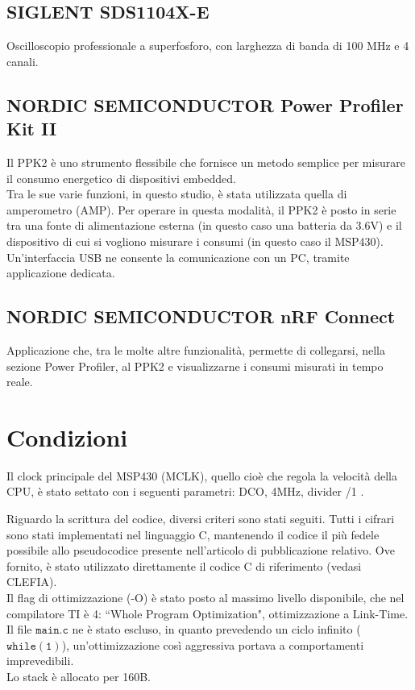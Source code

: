 \documentclass[target=bach,aauheader=,style=]{thud}
\begin{document}
		\subsection{SIGLENT SDS1104X-E}
		Oscilloscopio professionale a superfosforo, con larghezza di banda di 100 MHz e 4 canali.
		
		\subsection{NORDIC SEMICONDUCTOR Power Profiler Kit II}
		Il PPK2 è uno strumento flessibile che fornisce un metodo semplice per misurare il consumo energetico di dispositivi embedded.\\
		Tra le sue varie funzioni, in questo studio, è stata utilizzata quella di amperometro (AMP). Per operare in questa modalità, il PPK2 è posto in serie tra una fonte di alimentazione esterna (in questo caso una batteria da 3.6V) e il dispositivo di cui si vogliono misurare i consumi (in questo caso il MSP430).\\
		Un'interfaccia USB ne consente la comunicazione con un PC, tramite applicazione dedicata.
		
		\subsection{NORDIC SEMICONDUCTOR nRF Connect}
		Applicazione che, tra le molte altre funzionalità, permette di collegarsi, nella sezione Power Profiler, al PPK2 e visualizzarne i consumi misurati in tempo reale.
	\section{Condizioni}
	Il clock principale del MSP430 (MCLK), quello cioè che regola la velocità della CPU, è stato settato con i seguenti parametri: DCO, 4MHz, divider /1 \cite{mspuser}.
	
	Riguardo la scrittura del codice, diversi criteri sono stati seguiti. Tutti i cifrari sono stati implementati nel linguaggio C, mantenendo il codice il più fedele possibile allo pseudocodice presente nell'articolo di pubblicazione relativo. Ove fornito, è stato utilizzato direttamente il codice C di riferimento (vedasi CLEFIA).\\
	Il flag di ottimizzazione (-O) è stato posto al massimo livello disponibile, che nel compilatore TI è 4: ``Whole Program Optimization", ottimizzazione a Link-Time\cite{ticompiler}. Il file $\mathtt{main.c}$ ne è stato escluso, in quanto prevedendo un ciclo infinito ($\mathtt{while(1)}$), un'ottimizzazione così aggressiva portava a comportamenti imprevedibili.\\
	Lo stack è allocato per 160B.
	
\end{document}
